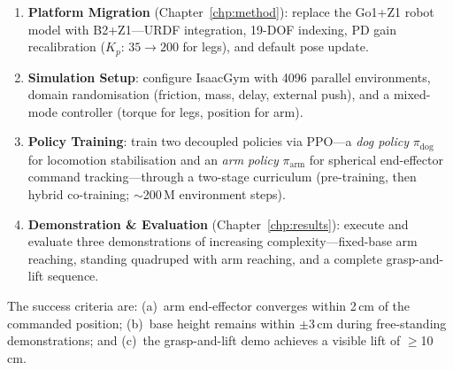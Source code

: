 \begin{enumerate}
  \item \textbf{Platform Migration}
        (Chapter~\ref{chp:method}): replace the Go1+Z1 robot
        model with B2+Z1---URDF integration, 19-DOF indexing, PD gain
        recalibration ($K_p$: $35\!\to\!200$ for legs), and default pose
        update.
  \item \textbf{Simulation Setup}: configure IsaacGym with
        4096 parallel environments, domain randomisation (friction, mass,
        delay, external push), and a mixed-mode controller (torque for
        legs, position for arm).
  \item \textbf{Policy Training}: train two decoupled policies
        via PPO---a \emph{dog policy} $\pi_\text{dog}$ for locomotion
        stabilisation and an \emph{arm policy} $\pi_\text{arm}$ for
        spherical end-effector command tracking---through a two-stage
        curriculum (pre-training, then hybrid co-training; $\sim$200\,M
        environment steps).
  \item \textbf{Demonstration \& Evaluation}
        (Chapter~\ref{chp:results}): execute and evaluate three
        demonstrations of increasing complexity---fixed-base arm reaching,
        standing quadruped with arm reaching, and a complete
        grasp-and-lift sequence.
\end{enumerate}

\noindent
The success criteria are:
(a)~arm end-effector converges within 2\,cm of the commanded position;
(b)~base height remains within $\pm$3\,cm during free-standing
demonstrations; and
(c)~the grasp-and-lift demo achieves a visible lift of $\geq$10\,cm.

